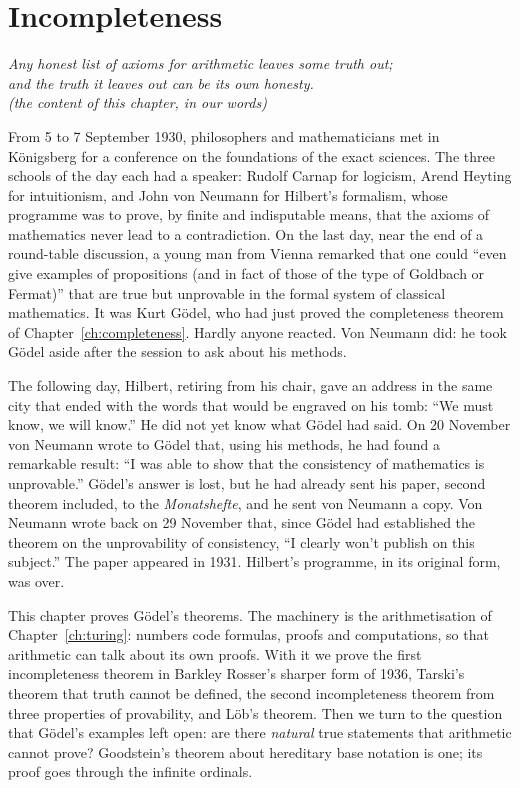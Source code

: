 \chapter{Incompleteness}\label{ch:incompleteness}

\begin{center}\itshape
Any honest list of axioms for arithmetic leaves some truth out;\\
and the truth it leaves out can be its own honesty.\\
\upshape(the content of this chapter, in our words)
\end{center}

From 5 to 7 September 1930, philosophers and mathematicians met in Königsberg for a conference on the foundations of the exact sciences. The three schools of the day each had a speaker: Rudolf Carnap for logicism, Arend Heyting for intuitionism, and John von Neumann for Hilbert's formalism, whose programme was to prove, by finite and indisputable means, that the axioms of mathematics never lead to a contradiction. On the last day, near the end of a round-table discussion, a young man from Vienna remarked that one could ``even give examples of propositions (and in fact of those of the type of Goldbach or Fermat)'' that are true but unprovable in the formal system of classical mathematics. It was Kurt Gödel, who had just proved the completeness theorem of Chapter~\ref{ch:completeness}. Hardly anyone reacted. Von Neumann did: he took Gödel aside after the session to ask about his methods.

The following day, Hilbert, retiring from his chair, gave an address in the same city that ended with the words that would be engraved on his tomb: ``We must know, we will know.'' He did not yet know what Gödel had said. On 20 November von Neumann wrote to Gödel that, using his methods, he had found a remarkable result: ``I was able to show that the consistency of mathematics is unprovable.'' Gödel's answer is lost, but he had already sent his paper, second theorem included, to the \emph{Monatshefte}, and he sent von Neumann a copy. Von Neumann wrote back on 29 November that, since Gödel had established the theorem on the unprovability of consistency, ``I clearly won't publish on this subject.'' The paper appeared in 1931. Hilbert's programme, in its original form, was over.

This chapter proves Gödel's theorems. The machinery is the arithmetisation of Chapter~\ref{ch:turing}: numbers code formulas, proofs and computations, so that arithmetic can talk about its own proofs. With it we prove the first incompleteness theorem in Barkley Rosser's sharper form of 1936, Tarski's theorem that truth cannot be defined, the second incompleteness theorem from three properties of provability, and Löb's theorem. Then we turn to the question that Gödel's examples left open: are there \emph{natural} true statements that arithmetic cannot prove? Goodstein's theorem about hereditary base notation is one; its proof goes through the infinite ordinals.

